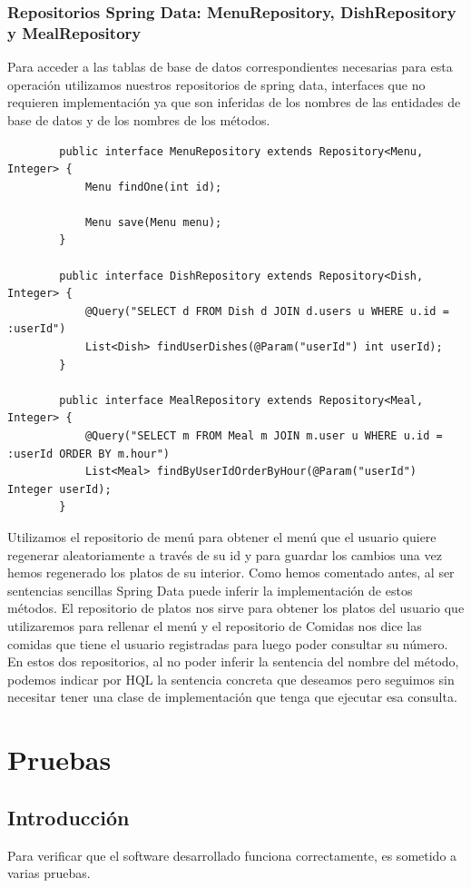 \documentclass[12pt, a4paper, twoside]{book}
\begin{document}
	\subsection{Repositorios Spring Data: MenuRepository, DishRepository y MealRepository}
	Para acceder a las tablas de base de datos correspondientes necesarias para esta operación utilizamos nuestros repositorios de spring data, interfaces que no requieren implementación ya que son inferidas de los nombres de las entidades de base de datos y de los nombres de los métodos.
	\begin{lstlisting}
		public interface MenuRepository extends Repository<Menu, Integer> {		
			Menu findOne(int id);
			
			Menu save(Menu menu);
		}
		
		public interface DishRepository extends Repository<Dish, Integer> {
			@Query("SELECT d FROM Dish d JOIN d.users u WHERE u.id = :userId")
			List<Dish> findUserDishes(@Param("userId") int userId);		
		}
		
		public interface MealRepository extends Repository<Meal, Integer> {
			@Query("SELECT m FROM Meal m JOIN m.user u WHERE u.id = :userId ORDER BY m.hour")
			List<Meal> findByUserIdOrderByHour(@Param("userId") Integer userId);		
		}
	\end{lstlisting}
	Utilizamos el repositorio de menú para obtener el menú que el usuario quiere regenerar aleatoriamente a través de su id y para guardar los cambios una vez hemos regenerado los platos de su interior. Como hemos comentado antes, al ser sentencias sencillas Spring Data puede inferir la implementación de estos métodos.
	El repositorio de platos nos sirve para obtener los platos del usuario que utilizaremos para rellenar el menú y el repositorio de Comidas nos dice las comidas que tiene el usuario registradas para luego poder consultar su número. En estos dos repositorios, al no poder inferir la sentencia del nombre del método, podemos indicar por HQL la sentencia concreta que deseamos pero seguimos sin necesitar tener una clase de implementación que tenga que ejecutar esa consulta.
	
	\chapter{Pruebas}
	\section{Introducción}
	Para verificar que el software desarrollado funciona correctamente, es sometido a varias pruebas.
\end{document}
